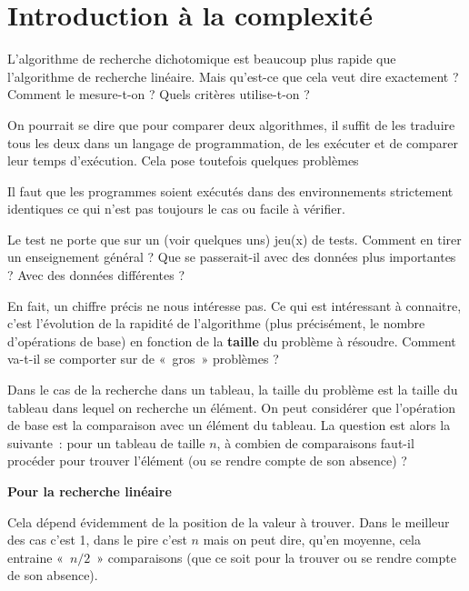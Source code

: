\section{Introduction à la complexité}

	L’algorithme de recherche dichotomique est beaucoup plus rapide que
	l’algorithme de recherche linéaire. Mais qu’est-ce que cela veut dire
	exactement ? Comment le mesure-t-on ? Quels critères utilise-t-on ?

	On pourrait se dire que pour comparer deux algorithmes, il suffit de les
	traduire tous les deux dans un langage de programmation, de les
	exécuter et de comparer leur temps d’exécution. Cela pose toutefois
	quelques problèmes
			
	\liststyleListv
	\begin{liste}
		\item 
			Il faut que les programmes soient exécutés dans des environnements
			strictement identiques ce qui n’est pas toujours le cas ou facile 
			à vérifier.
		\item 
			Le test ne porte que sur un (voir quelques uns) jeu(x) de tests. Comment
			en tirer un enseignement général ? Que se passerait-il avec des données
			plus importantes ? Avec des données différentes ?
	\end{liste}
	
	En fait, un chiffre précis ne nous intéresse pas. Ce qui est intéressant
	à connaitre, c’est l’évolution de la rapidité de l’algorithme (plus
	précisément, le nombre d’opérations de base) en fonction de la
	\textbf{taille} du problème à résoudre. Comment va-t-il se comporter
	sur de «~gros~» problèmes ?

	Dans le cas de la recherche dans un tableau, 
	la taille du problème est la taille du
	tableau dans lequel on recherche un élément. On peut considérer que
	l’opération de base est la comparaison avec un élément du tableau. La
	question est alors la suivante~: pour un tableau de taille $n$, à combien
	de comparaisons faut-il procéder pour trouver l’élément (ou se rendre
	compte de son absence) ?

	{\bfseries
	Pour la recherche linéaire}

		Cela dépend évidemment de la position de la valeur à trouver. Dans le
		meilleur des cas c’est 1, dans le pire c’est $n$ mais on peut dire, qu’en
		moyenne, cela entraine «~$n/2$~» comparaisons (que ce soit pour la
		trouver ou se rendre compte de son absence).

